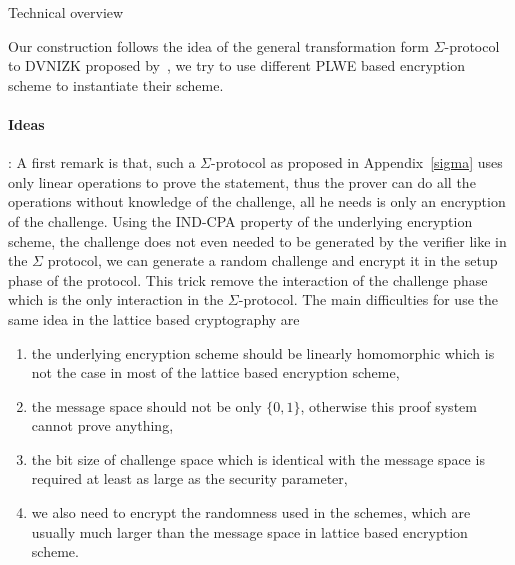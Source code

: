 \begin{subsection}{Technical overview}

  Our construction follows the idea of the general transformation form $\Sigma$-protocol to DVNIZK proposed by~\cite{DBLP:conf/pkc/ChaidosG15},
  we try to use different PLWE based encryption scheme to instantiate their scheme.

  \paragraph{Ideas}: A first remark is that, such a $\Sigma$-protocol as proposed in Appendix~\ref{sigma} uses only linear operations to prove the statement,
    thus the prover can do all the operations without knowledge of the challenge,
    all he needs is only an encryption of the challenge.
    Using the IND-CPA property of the underlying encryption scheme,
    the challenge does not even needed to be generated by the verifier like in the $\Sigma$ protocol,
    we can generate a random challenge and encrypt it in the setup phase of the protocol.
    This trick remove the interaction of the challenge phase which is the only interaction in the $\Sigma$-protocol.
    The main difficulties for use the same idea in the lattice based cryptography are
    \begin{enumerate}
    \item the underlying encryption scheme should be linearly homomorphic which is not the case in most of the lattice based encryption scheme,
    \item the message space should not be only $\{0,1\}$, otherwise this proof system cannot prove anything,
    \item the bit size of challenge space which is identical with the message space is required at least as large as the security parameter,
    \item we also need to encrypt the randomness used in the schemes, which are usually much larger than the message space in lattice based encryption scheme.
    \end{enumerate}  
  
\end{subsection}




